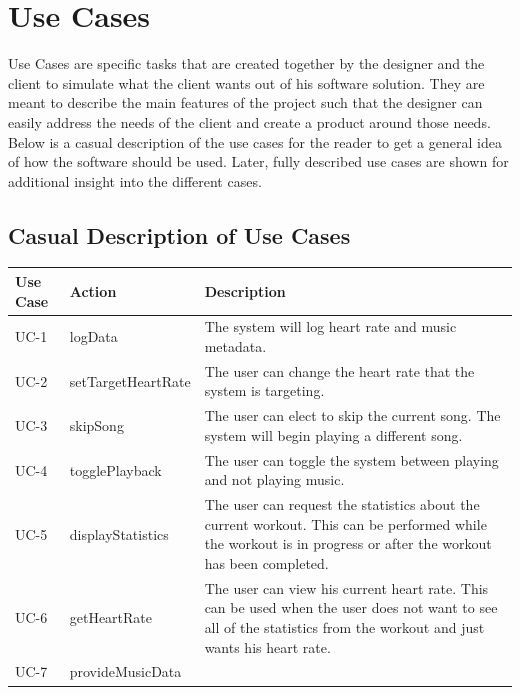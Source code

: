 \documentclass[letterpaper,english, 12pt]{scrreprt}
\begin{document}
\section{Use Cases}
Use Cases are specific tasks that are created together by the designer and the client to simulate what the client wants out of his software solution. They are meant to describe the main features of the project such that the designer can easily address the needs of the client and create a product around those needs. Below is a casual description of the use cases for the reader to get a general idea of how the software should be used. Later, fully described use cases are shown for additional insight into the different cases.

\subsection{Casual Description of Use Cases}
\begin{center}
        \begin{tabular}{|C{2cm}|C{2cm}|C{10cm}|}
                \hline
                        Use Case & Action & Description \\
                \hline
                        UC-1 & logData & The system will log heart rate and music metadata.\\
                \hline
                        UC-2 & setTargetHeartRate & The user can change the heart rate that the system is targeting.\\
                \hline
                        UC-3 & skipSong & The user can elect to skip the current song. The system will begin playing a different song.\\
                \hline
                        UC-4 & togglePlayback & The user can toggle the system between playing and not playing music.\\
                \hline
                        UC-5 & displayStatistics& The user can request the statistics about the current workout. This can be performed while the workout is in progress or after the workout has been completed. \\
                \hline
                        UC-6 & getHeartRate & The user can view his current heart rate. This can be used when the user does not want to see all of the statistics from the workout and just wants his heart rate. \\
                \hline
                        UC-7 & provideMusicData & \\
                \hline
        \end{tabular}
\end{center}
\end{document}
